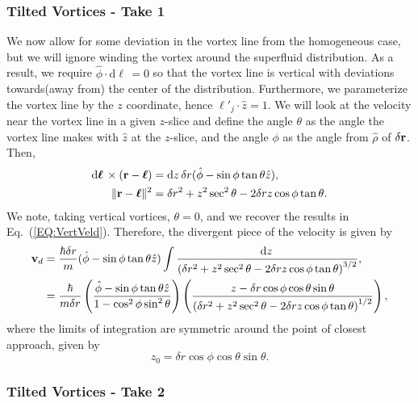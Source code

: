 \documentclass[onecolumn,nofootinbib,superscriptaddress]{revtex4}
\newcommand{\dd}[1]{\mathrm{d}#1\,}
\newcommand{\bfell}{\boldsymbol \ell}
\begin{document}
\subsubsection{Tilted Vortices - Take 1}

We now allow for some deviation in the vortex line from the homogeneous case, but we will ignore winding the vortex around the superfluid distribution.  As a result, we require $\hat{\phi}\cdot\dd{\boldsymbol \ell} = 0$ so that the vortex line is vertical with deviations towards(away from) the center of the distribution.  Furthermore, we parameterize the vortex line by the $z$ coordinate, hence ${\boldsymbol \ell}'_j\cdot \hat{z} = 1$.  We will look at the velocity near the vortex line in a given $z$-slice and define the angle $\theta$ as the angle the vortex line makes with $\hat{z}$ at the $z$-slice, and the angle $\phi$ as the angle from $\hat{\rho}$ of $\delta{\bf r}$.  Then,
\begin{align}
\dd{\bfell} \times ({\bf r} - \bfell) &= \dd{z} \delta r(\hat{\phi}-\sin\phi\tan\theta\hat{z}),\\
\|{\bf r} - \bfell\|^2 &= \delta r^2 + z^2 \sec^2\theta-2\delta r z\cos\phi\tan\theta.
\end{align}
We note, taking vertical vortices, $\theta = 0$, and we recover the results in Eq.~(\ref{EQ:VertVeld}).  Therefore, the divergent piece of the velocity is given by
\begin{align}
{\bf v}_d &= \frac{\hbar \delta r}{m}(\hat{\phi}-\sin\phi\tan\theta\hat{z})\int \frac{\dd{z}}{\left(\delta r^2 + z^2 \sec^2\theta-2\delta r z\cos\phi\tan\theta\right)^{3/2}},\\
&= \frac{\hbar}{m \delta r}\left(\frac{\hat{\phi}-\sin\phi\tan\theta\hat{z}}{1-\cos^2\phi\sin^2\theta}\right)\left(\frac{z-\delta r\cos\phi\cos\theta\sin\theta}{\left(\delta r^2 + z^2 \sec^2\theta-2\delta r z\cos\phi\tan\theta\right)^{1/2}}\right),
\end{align}
where the limits of integration are symmetric around the point of closest approach, given by
\begin{equation}
z_0 = \delta r \cos\phi\cos\theta\sin\theta.
\end{equation}

\subsubsection{Tilted Vortices - Take 2}
\end{document}
